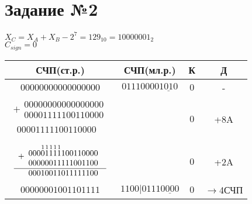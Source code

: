 \documentclass[12pt,a4paper]{report}
\begin{document}
\section*{Задание №2}
$X_C=X_A+X_B-2^7=129_{10}=10000001_2$\\
$C_{sign}=0$\\
\hfill\break
\begin{tabular}{|c|c|c|c|}
    \hline
    СЧП(ст.р.) & СЧП(мл.р.) & К & Д\\
    \hline
    $00000000000000000$ & $01110000\underline{1010}$ & $0$ & -\\
    \hline
        $
            \begin{array}{r}
            +
            \begin{array}{r}
            00000000000000000\\
            00001111100110000
            \end{array}\\
            \hline
            \begin{array}{r}
            00001111100110000
            \end{array}\\
            \end{array}
        $ & & $0$ & +8A\\
    \hline
        $
            \begin{array}{r}
            +
            \begin{array}{r}
            000\overset{\small{1}}{0}\overset{\small{1}}{1}\overset{\small{1}}{1}\overset{\small{1}}{1}\overset{\small{1}}{1}100110000\\
            00000011111001100
            \end{array}\\
            \hline
            \begin{array}{r}
            00010011011111100
            \end{array}\\
            \end{array}
        $ & & $0$ & +2A\\
    \hline
    $00000001001101111$ & $1100|0111\underline{0000}$ & $0$ & $\rightarrow$4СЧП\\

\end{tabular}
\end{document}
